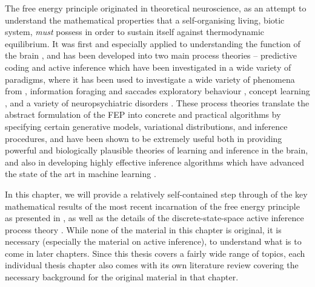 The free energy principle originated in theoretical neuroscience, as an attempt to understand the mathematical properties that a self-organising living, biotic system, \emph{must} possess in order to sustain itself against thermodynamic equilibrium. It was first and especially applied to understanding the function of the brain \citep{friston2006free,friston2010action,friston2012history}, and has been developed into two main process theories -- predictive coding \citep{rao1999predictive,friston2003learning,friston2005theory,friston2008hierarchical} and active inference \citep{friston2009reinforcement,friston2012active,friston2015active,friston2017process,friston2018deep,da2020active} which have been investigated in a wide variety of paradigms, where it has been used to investigate a wide variety of phenomena from \citep{friston2014anatomy,friston2015knowing,friston2015active}, information foraging and saccades \citep{parr2017uncertainty,parr2018active,parr2019computational} exploratory behaviour \citep{schwartenbeck2013exploration,friston2015active,friston2017curiosity,friston2020sophisticated}, concept learning \citep{schwartenbeck_computational_2019}, and a variety of neuropsychiatric disorders \citep{lawson2014aberrant,adams2012smooth,mirza2019impulsivity,cullen2018active}. These process theories translate the abstract formulation of the FEP into concrete and practical algorithms by specifying certain generative models, variational distributions, and inference procedures, and have been shown to be extremely useful both in providing powerful and biologically plausible theories of learning and inference in the brain, and also in developing highly effective inference algorithms which have advanced the state of the art in machine learning \citep{parr2019neuronal,millidge_deep_2019,tschantz2020reinforcement,millidge2020relationship}. 

In this chapter, we will provide a relatively self-contained step through of the key mathematical results of the most recent incarnation of the free energy principle as presented in \citep{friston2019particularphysics, parr2020markov}, as well as the details of the discrete-state-space active inference process theory \citep{friston2015active,da2020active}. While none of the material in this chapter is original, it is necessary (especially the material on active inference), to understand what is to come in later chapters. Since this thesis covers a fairly wide range of topics, each individual thesis chapter also comes with its own literature review covering the necessary background for the original material in that chapter.

